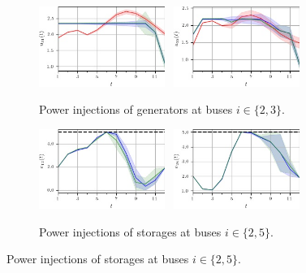 \documentclass[final,3p,times,twocolumn]{elsarticle}  %
\begin{document}
\begin{figure}[h]
	\centering
    
    \begin{subfigure}[c]{\figwidth}
    \centering
        \includegraphics[width=0.45\textwidth]{figures/time series/case39_volatile/gen_u_8102.jpg}~
    	\includegraphics[width=0.45\textwidth]{figures/time series/case39_volatile/gen_u_8106.jpg}%
    	\vspace{-2mm}	
    	\caption{Power injections of generators at buses $i \in \{2,3\}$.}
    \end{subfigure}
    
    \begin{subfigure}[c]{\figwidth}
    \centering
    	\includegraphics[width=0.45\textwidth]{figures/time series/case39_volatile/storage_e_4652.jpg}~
    	\includegraphics[width=0.45\textwidth]{figures/time series/case39_volatile/storage_e_4655.jpg}%
    	\vspace{-2mm}	
    	\caption{Power injections of storages at buses $i \in \{2,5\}$.}
    \end{subfigure}
    

\end{figure}
\end{document}
